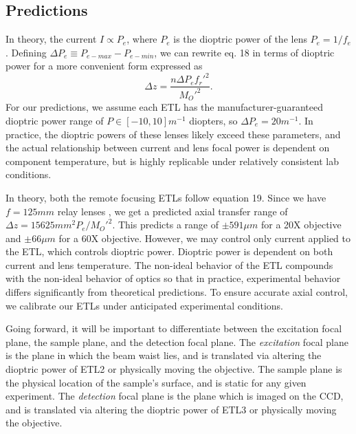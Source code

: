 \subsection{Predictions}
In theory, the current $I \propto P_e$, where $P_e$ is the dioptric power of the lens $P_e = 1/f_{e}$. Defining $\Delta P_e \equiv P_{e-max}-P_{e-min}$, we can rewrite eq. 18 in terms of dioptric power for a more convenient form expressed as
\begin{equation}
	\Delta z = \frac{n \Delta P_e f_r'^2}{M_O'^2}.
\end{equation}
For our predictions, we assume each ETL has the manufacturer-guaranteed dioptric power range of $P \in [-10, 10] m^{-1}$ diopters, so $\Delta P_e = 20 m^{-1}.$ In practice, the dioptric powers of these lenses likely exceed these parameters, and the actual relationship between current and lens focal power is dependent on component temperature, but is highly replicable under relatively consistent lab conditions.

\par In theory, both the remote focusing ETLs follow equation 19. Since we have $f=125mm$ relay lenses \cite{Liu}, we get a predicted axial transfer range of $\Delta z={15625mm^2P_e}/{M_O'^2}$. This predicts a range of $\pm 591 \mu m$ for a 20X objective and $\pm 66 \mu m$ for a 60X objective. However, we may control only current applied to the ETL, which controls dioptric power. Dioptric power is dependent on both current and lens temperature. The non-ideal behavior of the ETL compounds with the non-ideal behavior of optics so that in practice, experimental behavior differs significantly from theoretical predictions. To ensure accurate axial control, we calibrate our ETLs under anticipated experimental conditions.

\par Going forward, it will be important to differentiate between the excitation focal plane, the sample plane, and the detection focal plane. The \textit{excitation} focal plane is the plane in which the beam waist lies, and is translated via altering the dioptric power of ETL2 or physically moving the objective. The sample plane is the physical location of the sample's surface, and is static for any given experiment. The \textit{detection} focal plane is the plane which is imaged on the CCD, and is translated via altering the dioptric power of ETL3 or physically moving the objective.

